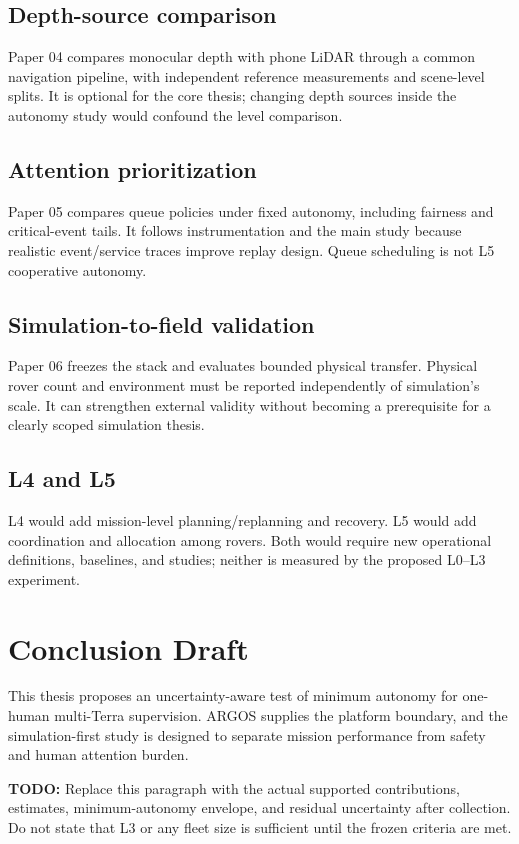 \documentclass[12pt,oneside]{report}
\newcommand{\todo}[1]{\par\noindent\textcolor{red!65!black}{\textbf{TODO:} #1}\par}
\begin{document}
\section{Depth-source comparison}
Paper 04 compares monocular depth with phone LiDAR through a common navigation pipeline, with independent reference measurements and scene-level splits. It is optional for the core thesis; changing depth sources inside the autonomy study would confound the level comparison.
\section{Attention prioritization}
Paper 05 compares queue policies under fixed autonomy, including fairness and critical-event tails. It follows instrumentation and the main study because realistic event/service traces improve replay design. Queue scheduling is not L5 cooperative autonomy.
\section{Simulation-to-field validation}
Paper 06 freezes the stack and evaluates bounded physical transfer. Physical rover count and environment must be reported independently of simulation's scale. It can strengthen external validity without becoming a prerequisite for a clearly scoped simulation thesis.
\section{L4 and L5}
L4 would add mission-level planning/replanning and recovery. L5 would add coordination and allocation among rovers. Both would require new operational definitions, baselines, and studies; neither is measured by the proposed L0--L3 experiment.
\chapter{Conclusion Draft}
This thesis proposes an uncertainty-aware test of minimum autonomy for one-human multi-Terra supervision. ARGOS supplies the platform boundary, and the simulation-first study is designed to separate mission performance from safety and human attention burden. \todo{Replace this paragraph with the actual supported contributions, estimates, minimum-autonomy envelope, and residual uncertainty after collection. Do not state that L3 or any fleet size is sufficient until the frozen criteria are met.}
\end{document}
